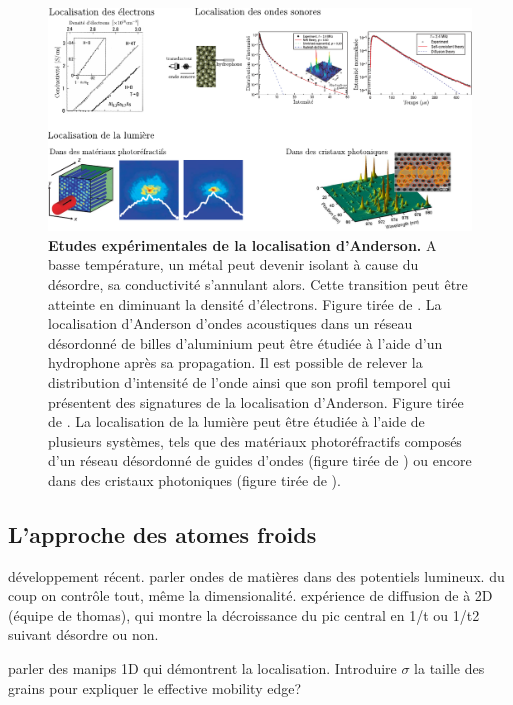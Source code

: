 \begin{figure}
\centering
\includegraphics[width=\textwidth]{Fig/Localisation/experiences_localisation_anderson.pdf}
\caption{\textbf{Etudes expérimentales de la localisation d'Anderson.} A basse température, un métal peut devenir isolant à cause du désordre, sa conductivité s'annulant alors. Cette transition peut être atteinte en diminuant la densité d'électrons. Figure tirée de \citep{katsumoto1987fine}. La localisation d'Anderson d'ondes acoustiques dans un réseau désordonné de billes d'aluminium peut être étudiée à l'aide d'un hydrophone après sa propagation. Il est possible de relever la distribution d'intensité de l'onde ainsi que son profil temporel qui présentent des signatures de la localisation d'Anderson. Figure tirée de \citep{hu2008localization}. La localisation de la lumière peut être étudiée à l'aide de plusieurs systèmes, tels que des matériaux photoréfractifs composés d'un réseau désordonné de guides d'ondes (figure tirée de \citep{schwartz2007transport}) ou encore dans des cristaux photoniques (figure tirée de \citep{sapienza2010cavity}).}
\label{fig:experiences_localisation_anderson}
\end{figure}






\subsection{L'approche des atomes froids}
développement récent.
parler ondes de matières dans des potentiels lumineux. du coup on contrôle tout, même la dimensionalité. 
expérience de diffusion de à 2D (équipe de thomas), qui montre la décroissance du  pic central en 1/t ou 1/t2 suivant désordre ou non.

parler des manips 1D qui démontrent la localisation. Introduire $\sigma$ la taille des grains pour expliquer le effective mobility edge?

